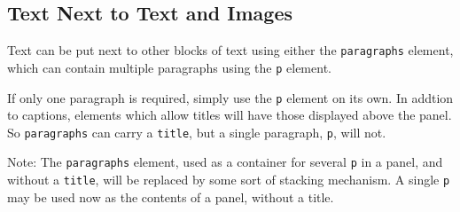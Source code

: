 \documentclass[10pt,]{article}
\theoremstyle{plain}
\theoremstyle{definition}
\theoremstyle{definition}
\theoremstyle{definition}
\theoremstyle{definition}
\theoremstyle{definition}
\theoremstyle{definition}
\numberwithin{equation}{section}
\begin{document}
\subsection[{Text Next to Text and Images}]{Text Next to Text and Images}\label{subsection-41}
\hypertarget{p-665}{}%
Text can be put next to other blocks of text using either the \lstinline?paragraphs? element, which can contain multiple paragraphs using the \lstinline?p? element.%
\par
\hypertarget{p-666}{}%
If only one paragraph is required, simply use the \lstinline?p? element on its own.  In addtion to captions, elements which allow titles will have those displayed above the panel.  So \lstinline?paragraphs? can carry a \lstinline?title?, but a single paragraph, \lstinline?p?, will not.%
\par
\hypertarget{p-667}{}%
Note: The \lstinline?paragraphs? element, used as a container for several \lstinline?p? in a panel, and without a \lstinline?title?, will be replaced by some sort of stacking mechanism.  A single \lstinline?p? may be used now as the contents of a panel, without a title.%
\end{document}

